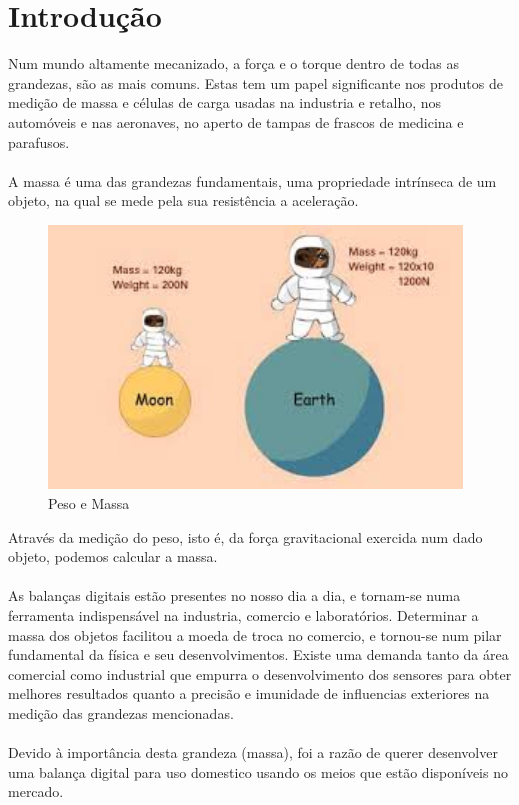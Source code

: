 \chapter{Introdução}
Num mundo altamente mecanizado, a força e o torque dentro de todas as grandezas, são as mais comuns. Estas tem um papel significante nos produtos de medição de massa e células de carga usadas na industria e retalho, nos automóveis e nas aeronaves, no aperto de tampas de frascos de medicina e parafusos.\cite{book-9}\\
\\
A massa é uma das grandezas fundamentais, uma propriedade intrínseca de um objeto, na qual se mede pela sua resistência a aceleração.\cite{book-2}
\begin{figure}[H]
	\centering
	\includegraphics[height=7cm]{./image/PESTA/fisica/mass.jpg}
	\caption{Peso e Massa}
	\label{mass}
\end{figure}
Através da medição do peso, isto é, da força gravitacional exercida num dado objeto, podemos calcular a massa. \cite{book-2}\\
\\
As balanças digitais estão presentes no nosso dia a dia, e tornam-se numa ferramenta indispensável na industria, comercio e laboratórios. Determinar a massa dos objetos facilitou a moeda de troca no comercio, e tornou-se num pilar fundamental da física e seu desenvolvimentos. Existe uma demanda tanto da área comercial como industrial que empurra o desenvolvimento dos sensores para obter melhores resultados quanto a precisão e imunidade de influencias exteriores na medição das grandezas mencionadas.\\
\\
Devido à importância desta grandeza (massa), foi a razão de querer desenvolver uma balança digital para uso domestico usando os meios que estão disponíveis no mercado.
\newpage
